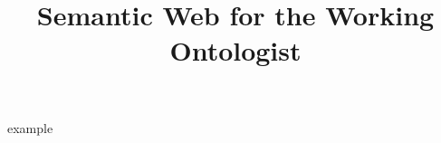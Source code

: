 \documentclass[times]{acm-book}%
\title{Semantic Web for the Working Ontologist}
\begin{document}
\newenvironment{challenge}[1][]{\refstepcounter{challenge}\par\medskip
   \textbf{CHALLENGE \thechallenge} \rmfamily}{\medskip}

\newenvironment{solution}[1][]{\textbf{SOLUTION}}


\newcounter{example}
\newenvironment{example}[1][]{\refstepcounter{example}\par\medskip
   \textbf{Example~\theexample. #1} \rmfamily}{\medskip}

\frontmatter

\mainmatter

















\backmatter

\end{document}
